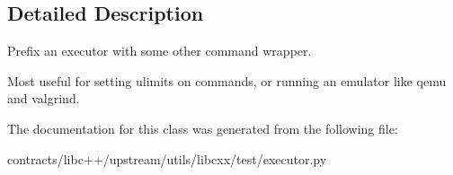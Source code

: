 \subsection{Detailed Description}
\begin{DoxyVerb}Prefix an executor with some other command wrapper.

Most useful for setting ulimits on commands, or running an emulator like
qemu and valgrind.
\end{DoxyVerb}
 

The documentation for this class was generated from the following file\+:\begin{DoxyCompactItemize}
\item 
contracts/libc++/upstream/utils/libcxx/test/executor.\+py\end{DoxyCompactItemize}
